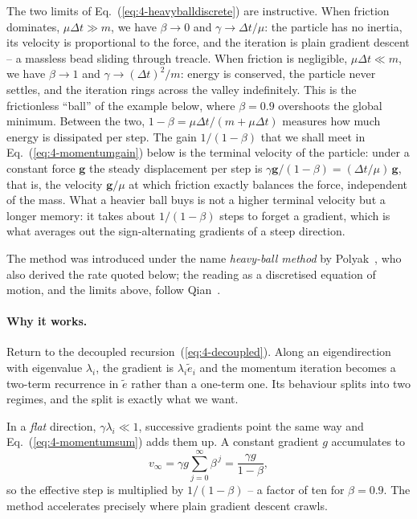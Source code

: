The two limits of Eq.~(\ref{eq:4-heavyballdiscrete}) are instructive.  When
friction dominates, $\mu\Delta t\gg m$, we have $\beta\to0$ and
$\gamma\to\Delta t/\mu$: the particle has no inertia, its velocity is
proportional to the force, and the iteration is plain gradient descent -- a
massless bead sliding through treacle.  When friction is negligible,
$\mu\Delta t\ll m$, we have $\beta\to1$ and $\gamma\to(\Delta t)^{2}/m$:
energy is conserved, the particle never settles, and the iteration rings
across the valley indefinitely.  This is the frictionless ``ball'' of the
example below, where $\beta=0.9$ overshoots the global minimum.  Between the
two, $1-\beta=\mu\Delta t/(m+\mu\Delta t)$ measures how much energy is
dissipated per step.  The gain $1/(1-\beta)$ that we shall meet in
Eq.~(\ref{eq:4-momentumgain}) below is the terminal velocity of the particle: under a constant force $\bm{g}$
the steady displacement per step is $\gamma\bm{g}/(1-\beta)=(\Delta t/\mu)\,
\bm{g}$, that is, the velocity $\bm{g}/\mu$ at which friction exactly
balances the force, independent of the mass.  What a heavier ball buys is
not a higher terminal velocity but a longer memory: it takes about
$1/(1-\beta)$ steps to forget a gradient, which is what averages out the
sign-alternating gradients of a steep direction.

The method was introduced under the name \emph{heavy-ball method} by
Polyak~\cite{polyak1964}, who also derived the rate quoted below; the
reading as a discretised equation of motion, and the limits above, follow
Qian~\cite{qian1999}.

\paragraph{Why it works.}
Return to the decoupled recursion~(\ref{eq:4-decoupled}).  Along an
eigendirection with eigenvalue $\lambda_i$, the gradient is
$\lambda_i\tilde{e}_i$ and the momentum iteration becomes a two-term
recurrence in $\tilde{e}$ rather than a one-term one.  Its behaviour splits
into two regimes, and the split is exactly what we want.

In a \emph{flat} direction, $\gamma\lambda_i\ll1$, successive gradients point
the same way and Eq.~(\ref{eq:4-momentumsum}) adds them up.  A constant
gradient $g$ accumulates to
\begin{equation}
  v_\infty = \gamma g \sum_{j=0}^{\infty}\beta^{\,j} = \frac{\gamma g}{1-\beta},
  \label{eq:4-momentumgain}
\end{equation}
so the effective step is multiplied by $1/(1-\beta)$ -- a factor of ten for
$\beta=0.9$.  The method accelerates precisely where plain gradient descent
crawls.

